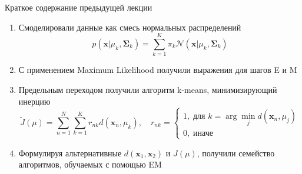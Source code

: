 \documentclass[10pt]{beamer}
\begin{document}
\begin{frame}{Краткое содержание предыдущей лекции}

\begin{enumerate}
\item Смоделировали данные как смесь нормальных распределений
\[
p(\mathbf{x} | \mu_k, \mathbf{\Sigma}_k) = \sum_{k=1}^K \pi_k \mathcal{N}(\mathbf{x} | \mu_k, \mathbf{\Sigma}_k)
\]
\item С применением Maximum Likelihood получили выражения для шагов E и M
\item Предельным переходом получили алгоритм k-means, минимизирующий инерцию
\[
\tilde J(\mu) = \sum_{n=1}^N \sum_{k=1}^K r_{nk} d(\mathbf{x}_n, \mu_k), \quad r_{nk} = \begin{cases}
1, \; \text{для } k = \arg \min_j d(\mathbf{x}_n, \mu_j) \\
0, \; \text{иначе}
\end{cases}
\]
\item Формулируя альтернативные $d(\mathbf{x}_1, \mathbf{x}_2)$ и $J(\mu)$, получили семейство алгоритмов, обучаемых с помощью EM
\end{enumerate}

\end{frame}
\end{document}
